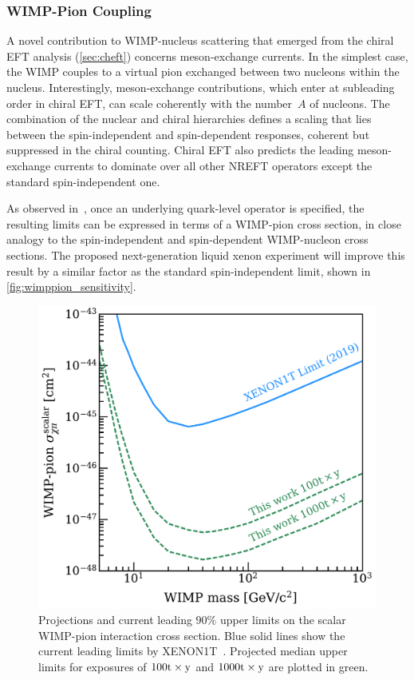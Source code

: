 \subsubsection{WIMP-Pion Coupling}\label{sec:wimp_pion}

A novel contribution to WIMP-nucleus scattering that emerged from the chiral EFT analysis (\autoref{sec:cheft}) concerns meson-exchange currents. In the simplest case, the WIMP couples to a virtual pion exchanged between two nucleons within the nucleus. Interestingly, meson-exchange contributions, which enter at subleading order in chiral EFT, can scale coherently with the number~$A$ of nucleons. The combination of the nuclear and chiral hierarchies defines a scaling that lies between the spin-independent and spin-dependent responses, coherent but suppressed in the chiral counting. Chiral EFT also predicts the leading meson-exchange currents to dominate over all other NREFT operators except the standard spin-independent one.

As observed in~\cite{Aprile:2018cxk}, once an underlying quark-level operator is specified, the resulting limits can be expressed in terms of a WIMP-pion cross section, in close analogy to the spin-independent and spin-dependent WIMP-nucleon cross sections. The proposed next-generation liquid xenon experiment will improve this result by a similar factor as the standard spin-independent limit, shown in \autoref{fig:wimppion_sensitivity}.

\begin{figure}[!htbp] 
	\centering
    \includegraphics[width=\columnwidth,clip]{fig_simplified_projection_pion.pdf}
    \caption{Projections and current leading $90\%$ upper limits on the scalar WIMP-pion interaction cross section. Blue solid lines show the current leading limits by XENON1T~\cite{Aprile:2018cxk}. Projected median upper limits for exposures of $100\mathrm{t}\times\mathrm{y}$ and $1000\mathrm{t}\times\mathrm{y}$ are plotted in green.}
\label{fig:wimppion_sensitivity}
\end{figure}

